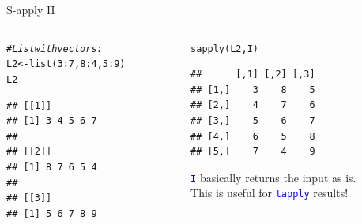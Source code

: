 \documentclass[xcolor=table,           xcolor=dvipsnames]{beamer}\usepackage[]{graphicx}\usepackage[]{color}
\makeatletter
\newcommand{\hlnum}[1]{\textcolor[rgb]{0,0,0}{#1}}
\newcommand{\hlcom}[1]{\textcolor[rgb]{0,0.392,0}{\textit{#1}}}
\newcommand{\hlopt}[1]{\textcolor[rgb]{0,0,0}{#1}}
\newcommand{\hlstd}[1]{\textcolor[rgb]{0,0,0}{#1}}
\newcommand{\hlkwb}[1]{\textcolor[rgb]{0,0,0}{#1}}
\newcommand{\hlkwd}[1]{\textcolor[rgb]{0,0,1}{#1}}
\newenvironment{kframe}{%
 \def\at@end@of@kframe{}%
 \ifinner\ifhmode%
  \def\at@end@of@kframe{\end{minipage}}%
  \begin{minipage}{\columnwidth}%
 \fi\fi%
 \def\FrameCommand##1{\hskip\@totalleftmargin \hskip-\fboxsep
 \colorbox{shadecolor}{##1}\hskip-\fboxsep
     \hskip-\linewidth \hskip-\@totalleftmargin \hskip\columnwidth}%
 \MakeFramed {\advance\hsize-\width
   \@totalleftmargin\z@ \linewidth\hsize
   \@setminipage}}%
 {\par\unskip\endMakeFramed%
 \at@end@of@kframe}
\newenvironment{knitrout}{}{} %
\newcommand{\rcode}[1]{\texttt{\textcolor{Blue}{#1}}} %
\makeatother
\begin{document}
\begin{frame}[fragile]{S-apply II}
\begin{columns}
\begin{column}{.45\textwidth}
\begin{knitrout}
\color{fgcolor}\begin{kframe}
\begin{alltt}
\hlcom{# List with vectors:}
\hlstd{L2} \hlkwb{<-} \hlkwd{list}\hlstd{(}\hlnum{3}\hlopt{:}\hlnum{7}\hlstd{,} \hlnum{8}\hlopt{:}\hlnum{4}\hlstd{,} \hlnum{5}\hlopt{:}\hlnum{9}\hlstd{)}
\hlstd{L2}
\end{alltt}
\begin{verbatim}
## [[1]]
## [1] 3 4 5 6 7
## 
## [[2]]
## [1] 8 7 6 5 4
## 
## [[3]]
## [1] 5 6 7 8 9
\end{verbatim}
\end{kframe}
\end{knitrout}
\end{column}
\pause
\begin{column}{.45\textwidth}
\begin{knitrout}
\color{fgcolor}\begin{kframe}
\begin{alltt}
\hlkwd{sapply}\hlstd{(L2, I)}
\end{alltt}
\begin{verbatim}
##      [,1] [,2] [,3]
## [1,]    3    8    5
## [2,]    4    7    6
## [3,]    5    6    7
## [4,]    6    5    8
## [5,]    7    4    9
\end{verbatim}
\end{kframe}
\end{knitrout}
\rcode{I} basically returns the input as is.\\
This is useful for \rcode{tapply} results!
\end{column}
\end{columns}
\end{frame}

\end{document}
